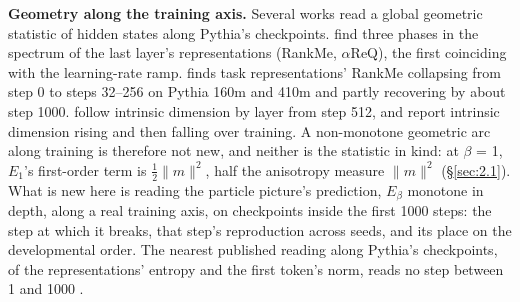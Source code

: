 \documentclass[11pt]{article}
\begin{document}
\textbf{Geometry along the training axis.} Several works read a global geometric statistic of hidden states along Pythia's checkpoints. \citet{li2025} find three phases in the spectrum of the last layer's representations (RankMe, $\alpha $ReQ), the first coinciding with the learning-rate ramp. \citet{billa2026} finds task representations' RankMe collapsing from step 0 to steps 32--256 on Pythia 160m and 410m and partly recovering by about step 1000. \citet{cheng2024} follow intrinsic dimension by layer from step 512, and \citet{razzhigaev2023} report intrinsic dimension rising and then falling over training. A non-monotone geometric arc along training is therefore not new, and neither is the statistic in kind: at $\beta $ = 1, $E_{1}$'s first-order term is $\tfrac12\|m\|^{2}$, half the anisotropy measure $\|m\|^{2}$ (\S\ref{sec:2.1}). What is new here is reading the particle picture's prediction, $E_\beta $ monotone in depth, along a real training axis, on checkpoints inside the first 1000 steps: the step at which it breaks, that step's reproduction across seeds, and its place on the developmental order. The nearest published reading along Pythia's checkpoints, of the representations' entropy and the first token's norm, reads no step between 1 and 1000 \citep{queipo2025}.
\end{document}
